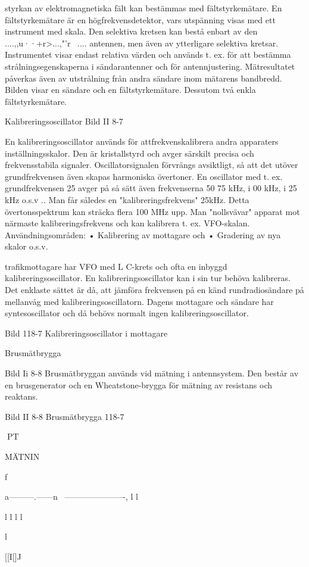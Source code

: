 styrkan av elektromagnetiska fält kan bestämmas med fältstyrkemätare.
En fältstyrkemätare är en högfrekvensdetektor, vars utspänning visas med ett instrument med skala. Den selektiva
kretsen kan bestå enbart av den ....,,u··+r>...,"'r~ ....
antennen, men även av ytterligare selektiva
kretsar. Instrumentet visar endast relativa
värden och används t. ex. för att bestämma
strålningsegenskaperna i sändarantenner
och för antennjustering. Mätresultatet påverkas även av utstrålning från andra sändare inom mätarens bandbredd. Bilden visar
en sändare och en fältstyrkemätare. Dessutom två enkla fältstyrkemätare.

Kalibreringsoscillator
Bild II 8-7

En kalibreringsoscillator används för attfrekvenskalibrera andra apparaters inställningsskalor. Den är kristallstyrd och avger särskilt
precisa och frekvensstabila signaler.
Oscillatorsignalen förvrängs avsiktligt, så
att det utöver grundfrekvensen även skapas
harmoniska övertoner. En
oscillator med t. ex. grundfrekvensen 25
avger på så sätt även frekvenserna 50
75 kHz, i 00 kHz, i 25 kHz o.s.v .. Man får
således en "kalibreringsfrekvens"
25kHz.
Detta övertonsspektrum kan sträcka
flera 100 MHz upp. Man "nollsvävar"
apparat mot närmaste kalibreringsfrekvens
och kan kalibrera t. ex. VFO-skalan.
Användningsområden:
• Kalibrering av mottagare och
• Gradering av nya skalor o.s.v.

trafikmottagare har VFO med
L C-krets och ofta en inbyggd kalibreringsoscillator. En kalibreringsoscillator kan i sin tur
behöva kalibreras. Det enklaste sättet är då,
att jämföra frekvensen på en känd rundradiosändare på mellanvåg med kalibreringsoscillatorn. Dagens mottagare och sändare
har syntesoscillator och då behövs normalt
ingen kalibreringsoscillator.

Bild 118-7 Kalibreringsoscillator i mottagare

Brusmätbrygga

Bild Ii 8-8
Brusmätbryggan används vid mätning i antennsystem. Den består av en brusgenerator och en Wheatstone-brygga för mätning
av resistans och reaktans.

Bild II 8-8 Brusmätbrygga
118-7

PT

MÄTNIN

f~

a---------.------n
~----------------------,
l
l

l
l
l
l

l

[[I[]J

